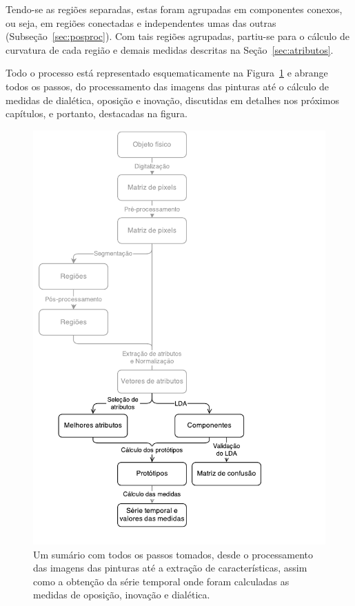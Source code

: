 Tendo-se as regiões separadas, estas foram agrupadas em componentes conexos, ou
seja, em regiões conectadas e independentes umas das outras
(Subseção~\ref{sec:posproc}). Com tais regiões agrupadas, partiu-se para o
cálculo de curvatura de cada região e demais medidas descritas na Seção~\ref{sec:atributos}.

Todo o processo está representado esquematicamente na Figura~\ref{fig:dataflow}
e abrange todos os passos, do processamento das imagens das pinturas até o
cálculo de medidas de dialética, oposição e inovação, discutidas em detalhes nos
próximos capítulos, e portanto, destacadas na figura.

\begin{figure}[ht!]
\begin{center}
        \includegraphics[scale=.6]{figs/dataflow_pintores3}
      \caption{Um sumário com todos os passos tomados, desde o processamento das
        imagens das pinturas até a extração de características, assim como a
        obtenção da série temporal onde foram calculadas as medidas de oposição,
        inovação e dialética.}
        \label{fig:dataflow}
\end{center}
\end{figure}

